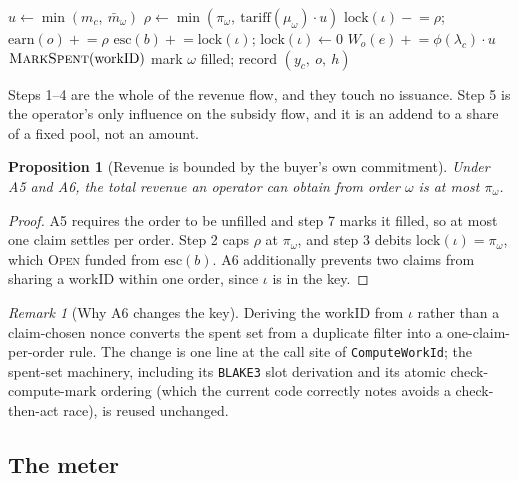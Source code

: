 \documentclass[11pt,a4paper]{article}
\newtheorem{proposition}[theorem]{Proposition}
\theoremstyle{definition}
\theoremstyle{remark}
\newtheorem{remark}{Remark}[section]
\newcommand{\code}[1]{\texttt{#1}}
\newcommand{\Ord}{\omega}
\newcommand{\Claim}{c}
\newcommand{\Admit}{\textsc{Admit}}
\begin{document}
\begin{algorithm}[H]
\caption{Settle a claim. Executes only if $\Admit(\Claim,\Ord,h)$ holds.}
\begin{algorithmic}[1]
\State $u \gets \min(m_\Claim,\ \bar m_\Ord)$ 
\State $\rho \gets \min(\pi_\Ord,\ \mathrm{tariff}(\mu_\Ord)\cdot u)$ 
\State $\mathrm{lock}(\iota) \mathrel{-}= \rho$; \quad $\mathrm{earn}(o) \mathrel{+}= \rho$
\State $\mathrm{esc}(b) \mathrel{+}= \mathrm{lock}(\iota)$; \quad $\mathrm{lock}(\iota) \gets 0$ 
\State $W_o(e) \mathrel{+}= \phi(\lambda_\Claim)\cdot u$ 
\State $\textsc{MarkSpent}(\mathrm{workID})$
\State mark $\Ord$ filled; record $(y_\Claim,\ o,\ h)$
\end{algorithmic}
\end{algorithm}

Steps 1--4 are the whole of the revenue flow, and they touch no issuance. Step 5
is the operator's only influence on the subsidy flow, and it is an addend to a
share of a fixed pool, not an amount.

\begin{proposition}[Revenue is bounded by the buyer's own commitment]
Under A5 and A6, the total revenue an operator can obtain from order $\Ord$ is
at most $\pi_\Ord$.
\end{proposition}
\begin{proof}
A5 requires the order to be unfilled and step 7 marks it filled, so at most one
claim settles per order. Step 2 caps $\rho$ at $\pi_\Ord$, and step 3 debits
$\mathrm{lock}(\iota) = \pi_\Ord$, which \textsc{Open} funded from
$\mathrm{esc}(b)$. A6 additionally prevents two claims from sharing a workID
within one order, since $\iota$ is in the key.
\end{proof}

\begin{remark}[Why A6 changes the key]
Deriving the workID from $\iota$ rather than a claim-chosen nonce converts the
spent set from a duplicate filter into a one-claim-per-order rule. The change is
one line at the call site of \code{ComputeWorkId}; the spent-set machinery,
including its \code{BLAKE3} slot derivation and its atomic
check-compute-mark ordering (which the current code correctly notes avoids a
check-then-act race), is reused unchanged.
\end{remark}

\subsection{The meter}
\label{sec:meter}
\end{document}
